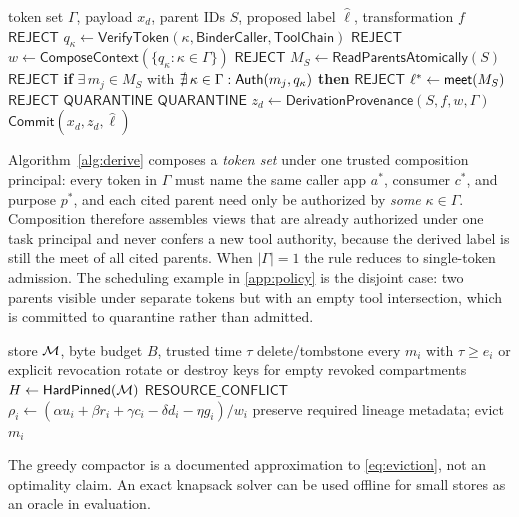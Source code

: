 \begin{algorithm}[t]
\caption{MemScope derived-memory admission with multi-token composition}
\label{alg:derive}
\begin{algorithmic}[1]
\Require token set $\Gamma$, payload $x_d$, parent IDs $S$, proposed label $\hat\ell$, transformation $f$
 \State \Return $\mathsf{REJECT}$ \EndIf
\ForAll{$\kappa\in\Gamma$}
  \State $q_\kappa\gets\mathsf{VerifyToken}(\kappa,\mathsf{BinderCaller},\mathsf{ToolChain})$
   \State \Return $\mathsf{REJECT}$ \EndIf
\EndFor
\State $w\gets\mathsf{ComposeContext}(\{q_\kappa:\kappa\in\Gamma\})$ 
 \State \Return $\mathsf{REJECT}$ \EndIf
\State $M_S\gets\mathsf{ReadParentsAtomically}(S)$
 \State \Return $\mathsf{REJECT}$ \EndIf
\State \textbf{if} $\exists\,m_j\in M_S$ with $\nexists\,\kappa\in\Gamma:\mathsf{Auth}(m_j,q_\kappa)$ \textbf{then} \Return $\mathsf{REJECT}$
\State $\ell^*\gets\mathsf{meet}(M_S)$
\If{$\neg(\hat\ell\preceq\ell^*)$} \State \Return $\mathsf{REJECT}$ \EndIf
{} \State \Return $\mathsf{QUARANTINE}$ \EndIf
{} \State \Return $\mathsf{QUARANTINE}$ \EndIf
\State $z_d\gets\mathsf{DerivationProvenance}(S,f,w,\Gamma)$
\State \Return $\mathsf{Commit}(x_d,z_d,\hat\ell)$
\end{algorithmic}
\end{algorithm}

Algorithm~\ref{alg:derive} composes a \emph{token set} under one trusted composition principal: every token in $\Gamma$ must name the same caller app $a^*$, consumer $c^*$, and purpose $p^*$, and each cited parent need only be authorized by \emph{some} $\kappa\in\Gamma$. Composition therefore assembles views that are already authorized under one task principal and never confers a new tool authority, because the derived label is still the meet of all cited parents. When $|\Gamma|=1$ the rule reduces to single-token admission. The scheduling example in \cref{app:policy} is the disjoint case: two parents visible under separate tokens but with an empty tool intersection, which is committed to quarantine rather than admitted.

\begin{algorithm}[t]
\caption{MemScope policy-aware compaction}
\label{alg:compact}
\begin{algorithmic}[1]
\Require store $\mathcal{M}$, byte budget $B$, trusted time $\tau$
\State delete/tombstone every $m_i$ with $\tau\ge e_i$ or explicit revocation
\State rotate or destroy keys for empty revoked compartments
 \State \Return \EndIf
\State $H\gets\mathsf{HardPinned}(\mathcal{M})$
 \State \Return $\mathsf{RESOURCE\_CONFLICT}$ \EndIf
{}
  \State $\rho_i\gets(\alpha u_i+\beta r_i+\gamma c_i-\delta d_i-\eta g_i)/w_i$
\EndFor
{}
  \State preserve required lineage metadata; evict $m_i$
   \State \Return \EndIf
\EndFor
\end{algorithmic}
\end{algorithm}

The greedy compactor is a documented approximation to \cref{eq:eviction}, not an optimality claim. An exact knapsack solver can be used offline for small stores as an oracle in evaluation.
